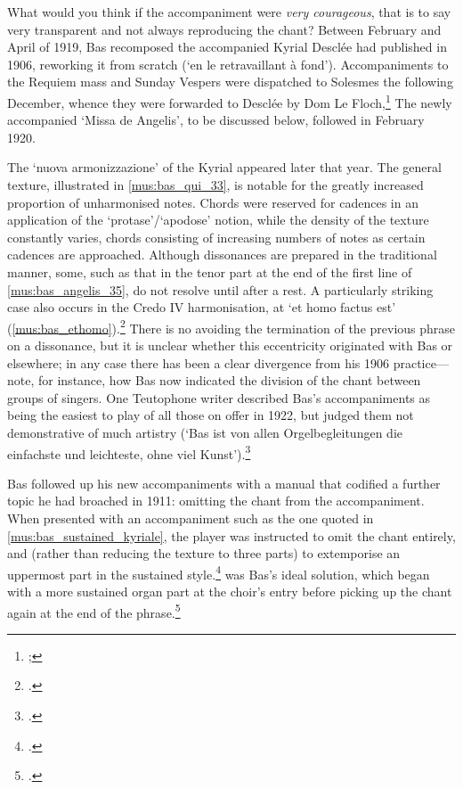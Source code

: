   {}
{What would you think if the accompaniment were \emph{very courageous}, that is to say very transparent and not always reproducing the chant?}
\noindent
Between February and April of 1919, Bas recomposed the accompanied Kyrial Desclée had published in 1906, reworking it from scratch (`en le retravaillant à fond').
Accompaniments to the Requiem mass and Sunday Vespers were dispatched to Solesmes the following December, whence they were forwarded to Desclée by Dom Le Floch,\footnote{; }
The newly accompanied `Missa de Angelis', to be discussed below, followed in February 1920.

The `nuova armonizzazione' of the Kyrial appeared later that year.
The general texture, illustrated in \cref{mus:bas_qui_33}, is notable for the greatly increased proportion of unharmonised notes.
Chords were reserved for cadences in an application of the `protase'/`apodose' notion, while the density of the texture constantly varies, chords consisting of increasing numbers of notes as certain cadences are approached.
Although dissonances are prepared in the traditional manner, some, such as that in the tenor part at the end of the first line of \cref{mus:bas_angelis_35}, do not resolve until after a rest.
A particularly striking case also occurs in the Credo IV harmonisation, at `et homo factus est' (\cref{mus:bas_ethomo}).\footcite[33, 35, 78]{BasKyrialeseuordinarium1920}
There is no avoiding the termination of the previous phrase on a dissonance, but it is unclear whether this eccentricity originated with Bas or elsewhere; in any case there has been a clear divergence from his 1906 practice---note, for instance, how Bas now indicated the division of the chant between groups of singers.
One Teutophone writer described Bas's accompaniments as being the easiest to play of all those on offer in 1922, but judged them not demonstrative of much artistry (`Bas ist von allen Orgelbegleitungen die einfachste und leichteste, ohne viel Kunst').\footcite[25]{WeitzelFuehrerdurchkatholische1922}

Bas followed up his new accompaniments with a manual that codified a further topic he had broached in 1911: omitting the chant from the accompaniment.
When presented with an accompaniment such as the one quoted in \cref{mus:bas_sustained_kyriale}, the player was instructed to omit the chant entirely, and (rather than reducing the texture to three parts) to extemporise an uppermost part in the sustained style.\footcite[38]{BasKyrialeseuordinarium1920}
 was Bas's ideal solution, which began with a more sustained organ part at the choir's entry before picking up the chant again at the end of the phrase.\footcite[144--5]{BasMethodeaccompagnementchant1923}
\nowidow[2]

